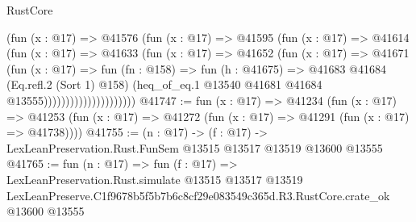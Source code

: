 \begin{lexlean}{RustCore}
\begin{coremodule}
                              (fun (x : @17) =>
                              @41576
                                (fun (x : @17) =>
                                @41595
                                  (fun (x : @17) =>
                                  @41614
                                    (fun (x : @17) =>
                                    @41633
                                      (fun (x : @17) =>
                                      @41652
                                        (fun (x : @17) =>
                                        @41671
                                          (fun (x : @17) =>
                                          fun (fn : @158) =>
                                          fun (h : @41675) =>
                                          @41683
                                            @41684
                                            (Eq.refl.{2} (Sort 1) @158)
                                            (heq_of_eq.{1}
                                              @13540
                                              @41681
                                              @41684
                                              @13555)))))))))))))))))))))
@41747 := fun (x : @17) =>
  @41234
    (fun (x : @17) =>
    @41253 (fun (x : @17) => @41272 (fun (x : @17) => @41291 (fun (x : @17) => @41738))))
@41755 := (n : @17) ->
  (f : @17) -> LexLeanPreservation.Rust.FunSem @13515 @13517 @13519 @13600 @13555
@41765 := fun (n : @17) =>
  fun (f : @17) =>
  LexLeanPreservation.Rust.simulate
    @13515
    @13517
    @13519
    LexLeanPreserve.C1f9678b5f5b7b6c8cf29e083549c365d.R3.RustCore.crate_ok
    @13600
    @13555
\end{coremodule}
\end{lexlean}
